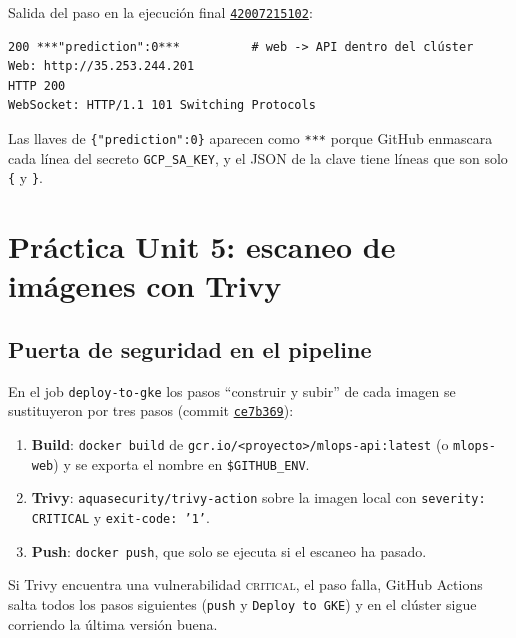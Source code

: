 \documentclass[11pt,a4paper]{article}
\newcommand{\code}[1]{\texttt{#1}}
\newcommand{\run}[1]{\href{https://github.com/JES0406/mlops-practica-icai/actions/runs/#1}{\code{#1}}}
\newcommand{\commit}[1]{\href{https://github.com/JES0406/mlops-practica-icai/commit/#1}{\code{#1}}}
\begin{document}
Salida del paso en la ejecución final \run{42007215102}:

\begin{lstlisting}[style=plain]
200 ***"prediction":0***          # web -> API dentro del clúster
Web: http://35.253.244.201
HTTP 200
WebSocket: HTTP/1.1 101 Switching Protocols
\end{lstlisting}

Las llaves de \code{\{"prediction":0\}} aparecen como \code{***} porque GitHub enmascara
cada línea del secreto \code{GCP\_SA\_KEY}, y el JSON de la clave tiene líneas que son
solo \code{\{} y \code{\}}.

\section{Práctica Unit 5: escaneo de imágenes con Trivy}

\subsection{Puerta de seguridad en el pipeline}

En el job \code{deploy-to-gke} los pasos ``construir y subir'' de cada imagen se
sustituyeron por tres pasos (commit \commit{ce7b369}):

\begin{enumerate}[nosep]
  \item \textbf{Build}: \code{docker build} de \code{gcr.io/<proyecto>/mlops-api:latest}
    (o \code{mlops-web}) y se exporta el nombre en \code{\$GITHUB\_ENV}.
  \item \textbf{Trivy}: \code{aquasecurity/trivy-action} sobre la imagen local con
    \code{severity: CRITICAL} y \code{exit-code: '1'}.
  \item \textbf{Push}: \code{docker push}, que solo se ejecuta si el escaneo ha pasado.
\end{enumerate}

Si Trivy encuentra una vulnerabilidad \textsc{critical}, el paso falla, GitHub Actions
salta todos los pasos siguientes (\code{push} y \code{Deploy to GKE}) y en el clúster
sigue corriendo la última versión buena.
\end{document}
